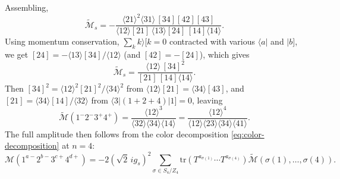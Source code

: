 Assembling,
\[
	\widetilde{\mathcal{M}}_s = -\frac{\langle 21 \rangle^2 \langle 31 \rangle\, [34][42][43]}{\langle 12 \rangle [21]\, \langle 13 \rangle [24]\, [14] \langle 14 \rangle}
.\]
Using momentum conservation, $\sum_k k\rangle[k = 0$ contracted with various $\langle a |$ and $| b]$, we get $[24] = -\langle 13 \rangle [34] / \langle 12 \rangle$ (and $[42] = -[24]$), which gives
\[
	\widetilde{\mathcal{M}}_s = \frac{\langle 12 \rangle\, [34]^2}{[21]\, [14] \langle 14 \rangle}
.\]
Then $[34]^2 = \langle 12 \rangle^2 [21]^2 / \langle 34 \rangle^2$ from $\langle 12 \rangle [21] = \langle 34 \rangle [43]$, and $[21] = \langle 34 \rangle [14] / \langle 32 \rangle$ from $\langle 3 | (1+2+4) | 1] = 0$, leaving
\[
	\widetilde{\mathcal{M}}(1^-2^-3^+4^+) = \frac{\langle 12 \rangle^3}{\langle 32 \rangle \langle 34 \rangle \langle 14 \rangle}
	= \frac{\langle 12 \rangle^4}{\langle 12 \rangle \langle 23 \rangle \langle 34 \rangle \langle 41 \rangle}
.\]
The full amplitude then follows from the color decomposition \eqref{eq:color-decomposition} at $n = 4$:
\[
	\mathcal{M}(1^{a-} 2^{b-} 3^{c+} 4^{d+}) = -2\left(\sqrt{2}\, i g_s\right)^{2} \sum_{\sigma \in S_4 / Z_4} \mathrm{tr}\!\left(T^{a_{\sigma(1)}} \cdots T^{a_{\sigma(4)}}\right) \widetilde{\mathcal{M}}\!\left(\sigma(1), \ldots, \sigma(4)\right)
.\]

